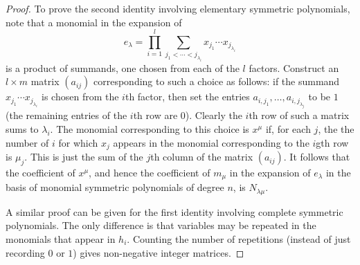 \documentclass[11pt]{amsproc}
\theoremstyle{definition}
\theoremstyle{example}
\begin{document}
\begin{proof}
  To prove the second identity involving elementary symmetric polynomials, note that a monomial in the expansion of
  \begin{displaymath}
    e_\lambda = \prod_{i=1}^l \sum_{j_1<\dotsb<j_{\lambda_i}}x_{j_1}\dotsb x_{j_{\lambda_i}}
  \end{displaymath}
  is a product of summands, one chosen from each of the $l$ factors.
  Construct an $l\times m$ matrix $(a_{ij})$ corresponding to such a choice as follows:
  if the summand $x_{j_1}\dotsb x_{j_{\lambda_i}}$ is chosen from the $i$th factor, then set the entries $a_{i,j_1},\dotsc, a_{i, j_{\lambda_j}}$ to be $1$ (the remaining entries of the $i$th row are $0$).
  Clearly the $i$th row of such a matrix sums to $\lambda_i$.
  The monomial corresponding to this choice is $x^\mu$ if, for each $j$, the the number of $i$ for which $x_j$ appears in the monomial corresponding to the $i$gth row is $\mu_j$. This is just the sum of the $j$th column of the matrix $(a_{ij})$.
  It follows that the coefficient of $x^\mu$, and hence the coefficient of $m_\mu$ in the expansion of $e_\lambda$ in the basis of monomial symmetric polynomials of degree $n$, is $N_{\lambda\mu}$.

A similar proof can be given for the first identity involving complete symmetric polynomials. The only difference is that variables may be repeated in the monomials that appear in $h_i$. Counting the number of repetitions (instead of just recording $0$ or $1$) gives non-negative integer matrices.
\end{proof}
\end{document}
